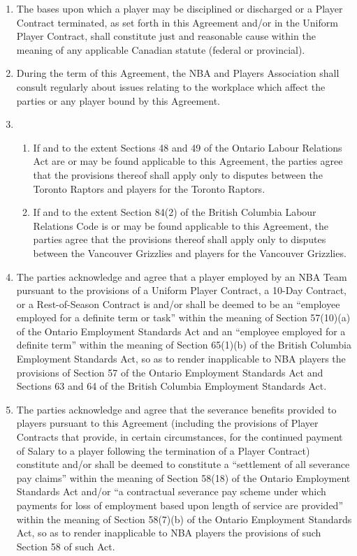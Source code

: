 \documentclass[
]{book}
\providecommand{\tightlist}{%
  \setlength{\itemsep}{0pt}\setlength{\parskip}{0pt}}
\begin{document}
\begin{enumerate}
\def\labelenumi{(\alph{enumi})}
\item
  The bases upon which a player may be disciplined or discharged or a Player Contract terminated, as set forth in this Agreement and/or in the Uniform Player Contract, shall constitute just and reasonable cause within the meaning of any applicable Canadian statute (federal or provincial).
\item
  During the term of this Agreement, the NBA and Players Association shall consult regularly about issues relating to the workplace which affect the parties or any player bound by this Agreement.
\item
  \begin{enumerate}
  \def\labelenumii{(\roman{enumii})}
  \tightlist
  \item
    If and to the extent Sections 48 and 49 of the Ontario Labour Relations Act are or may be found applicable to this Agreement, the parties agree that the provisions thereof shall apply only to disputes between the Toronto Raptors and players for the Toronto Raptors.
  \item
    If and to the extent Section 84(2) of the British Columbia Labour Relations Code is or may be found applicable to this Agreement, the parties agree that the provisions thereof shall apply only to disputes between the Vancouver Grizzlies and players for the Vancouver Grizzlies.
  \end{enumerate}
\item
  The parties acknowledge and agree that a player employed by an NBA Team pursuant to the provisions of a Uniform Player Contract, a 10-Day Contract, or a Rest-of-Season Contract is and/or shall be deemed to be an ``employee employed for a definite term or task'' within the meaning of Section 57(10)(a) of the Ontario Employment Standards Act and an ``employee employed for a definite term'' within the meaning of Section 65(1)(b) of the British Columbia Employment Standards Act, so as to render inapplicable to NBA players the provisions of Section 57 of the Ontario Employment Standards Act and Sections 63 and 64 of the British Columbia Employment Standards Act.
\item
  The parties acknowledge and agree that the severance benefits provided to players pursuant to this Agreement (including the provisions of Player Contracts that provide, in certain circumstances, for the continued payment of Salary to a player following the termination of a Player Contract) constitute and/or shall be deemed to constitute a ``settlement of all severance pay claims'' within the meaning of Section 58(18) of the Ontario Employment Standards Act and/or ``a contractual severance pay scheme under which payments for loss of employment based upon length of service are provided'' within the meaning of Section 58(7)(b) of the Ontario Employment Standards Act, so as to render inapplicable to NBA players the provisions of such Section 58 of such Act.

\end{enumerate}
\end{document}
